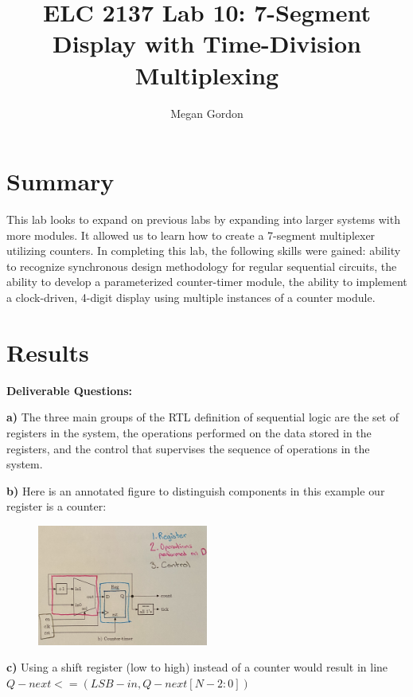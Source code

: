\documentclass[11pt]{article}
\begin{document}
\title{ELC 2137 Lab 10: 7-Segment Display with Time-Division Multiplexing}
\author{Megan Gordon}

\maketitle


\section*{Summary}

This lab looks to expand on previous labs by expanding into larger systems with more modules. It allowed us to learn how to create a 7-segment multiplexer utilizing counters. In completing this lab, the following skills were gained: ability to recognize synchronous design methodology for regular sequential circuits, the ability to develop a parameterized counter-timer module, the ability to implement a clock-driven, 4-digit display using multiple instances of a counter module. 



\section*{Results}

\textbf{Deliverable Questions:}

\medskip
\textbf{a)} The three main groups of the RTL definition of sequential logic are the set of registers in the system, the operations performed on the data stored in the registers, and the control that supervises the sequence of operations in the system.

\textbf{b)} Here is an annotated figure to distinguish components in this example our register is a counter:
\begin{figure}[ht]\centering
	\includegraphics[angle=0, width=0.5\textwidth]{IMG_6712.jpg}
\end{figure}

\textbf{c)} Using a shift register (low to high) instead of a counter would result in line $Q-next<=(LSB-in, Q-next[N-2:0])$
\end{document}
